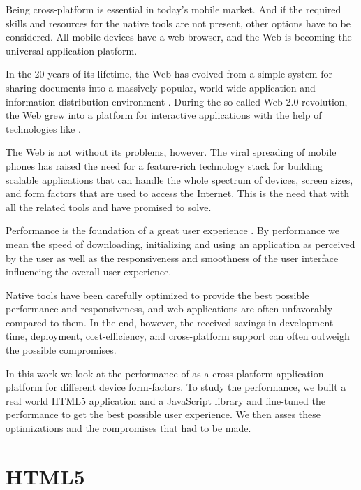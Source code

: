 
Being cross-platform is essential in today's mobile market. And if the
required skills and resources for the native tools are not present,
other options have to be considered. All mobile devices have a web
browser, and the Web is becoming the universal application
platform. \cite{taivalsaari2011web, mikkonen2011apps}

In the 20 years of its lifetime, the Web has evolved from a simple
system for sharing documents into a massively popular, world wide
application and information distribution environment
\cite{taivalsaari2011web}. During the so-called Web 2.0 revolution,
the Web grew into a platform for interactive applications with the
help of technologies like  \cite{garrett2005ajax}.

The Web is not without its problems, however. The viral spreading of
mobile phones has raised the need for a feature-rich technology stack
for building scalable applications that can handle the whole spectrum
of devices, screen sizes, and form factors that are used to access the
Internet. This is the need that  with all the related
tools and  have promised to solve.

Performance is the foundation of a great user experience
\cite{charland2011mobile}. By performance we mean the speed of
downloading, initializing and using an application as perceived by the
user as well as the responsiveness and smoothness of the user
interface influencing the overall user experience.

Native tools have been carefully optimized to provide the best
possible performance and responsiveness, and web applications are
often unfavorably compared to them. In the end, however, the received
savings in development time, deployment, cost-efficiency, and
cross-platform support can often outweigh the possible
compromises. \cite{charland2011mobile, fling2009mobile}

In this work we look at the performance of  as a
cross-platform application platform for different device
form-factors. To study the performance, we built a real world HTML5
application and a JavaScript library and fine-tuned the performance to
get the best possible user experience. We then asses these
optimizations and the compromises that had to be made.


\section{HTML5}
\label{section:html5}

